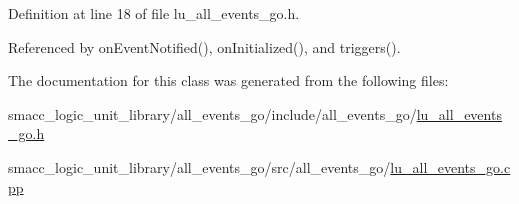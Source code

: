 Definition at line 18 of file lu\+\_\+all\+\_\+events\+\_\+go.\+h.



Referenced by on\+Event\+Notified(), on\+Initialized(), and triggers().



The documentation for this class was generated from the following files\+:\begin{DoxyCompactItemize}
\item 
smacc\+\_\+logic\+\_\+unit\+\_\+library/all\+\_\+events\+\_\+go/include/all\+\_\+events\+\_\+go/\hyperlink{lu__all__events__go_8h}{lu\+\_\+all\+\_\+events\+\_\+go.\+h}\item 
smacc\+\_\+logic\+\_\+unit\+\_\+library/all\+\_\+events\+\_\+go/src/all\+\_\+events\+\_\+go/\hyperlink{lu__all__events__go_8cpp}{lu\+\_\+all\+\_\+events\+\_\+go.\+cpp}\end{DoxyCompactItemize}
